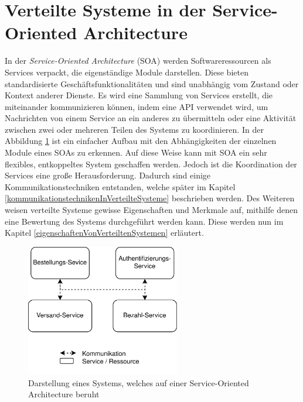 \section{Verteilte Systeme in der Service-Oriented Architecture}

In der \emph{Service-Oriented Architecture} (SOA) werden Softwareressourcen als Services verpackt, die eigenständige Module darstellen. Diese bieten standardisierte Geschäftsfunktionalitäten und sind unabhängig vom Zustand oder Kontext anderer Dienste. Es wird eine Sammlung von Services erstellt, die miteinander kommunizieren können, indem eine API verwendet wird, um Nachrichten von einem Service an ein anderes zu übermitteln oder eine Aktivität zwischen zwei oder mehreren Teilen des Systems zu koordinieren. In der Abbildung \ref{fig:serviceOrientatedArchitecture} ist ein einfacher Aufbau mit den Abhängigkeiten der einzelnen Module eines SOAs zu erkennen. Auf diese Weise kann mit SOA ein sehr flexibles, entkoppeltes System geschaffen werden. Jedoch ist die Koordination der Services eine große Herausforderung. Dadurch sind einige Kommunikationstechniken entstanden, welche später im Kapitel \ref{kommunikationstechnikenInVerteilteSysteme} beschrieben werden. Des Weiteren weisen verteilte Systeme gewisse Eigenschaften und Merkmale auf, mithilfe denen eine Bewertung des Systems durchgeführt werden kann. Diese werden nun im Kapitel \ref{eigenschaftenVonVerteiltenSystemen} erläutert.
\cite{papazoglouServiceOrientedArchitectures2007}

\begin{figure}
    \centering
    \includegraphics[width=0.6\textwidth]{content/img/Research/Message_Services/serviceOrientatedArchitecture.png}
    \caption{Darstellung eines Systems, welches auf einer Service-Oriented Architecture beruht}
    \label{fig:serviceOrientatedArchitecture}
\end{figure}
\FloatBarrier

